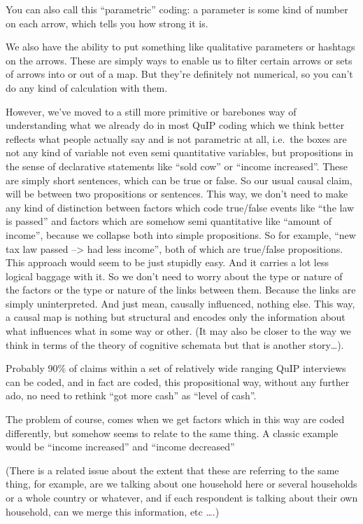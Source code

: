 \documentclass[
]{book}
\begin{document}
You can also call this ``parametric'' coding: a parameter is some kind of number on each arrow, which tells you how strong it is.

We also have the ability to put something like qualitative parameters or hashtags on the arrows. These are simply ways to enable us to filter certain arrows or sets of arrows into or out of a map. But they're definitely not numerical, so you can't do any kind of calculation with them.

However, we've moved to a still more primitive or barebones way of understanding what we already do in most QuIP coding
which we think better reflects what people actually say and is not parametric at all, i.e.~the boxes are not any kind of variable not even semi quantitative variables, but propositions in the sense of declarative statements like ``sold cow'' or ``income increased''. These are simply short sentences, which can be true or false. So our usual causal claim, will be between
two propositions or sentences. This way, we don't need to make any kind of distinction between factors which
code true/false events like ``the law is passed'' and factors which are somehow semi quantitative like ``amount of income'', because we collapse both into simple propositions. So for example, ``new tax law passed --\textgreater{} had less income'', both of which are true/false propositions. This approach would seem to be just stupidly easy. And it carries a lot less logical baggage with it. So we don't need to worry about the type or nature of the factors or the type or nature of the links between them. Because the links are simply uninterpreted. And just mean, causally influenced, nothing else. This way, a causal map is nothing but structural and encodes only the information about what influences what in some way or other. (It may also be closer to the way we think in terms of the theory of cognitive schemata but that is another story\ldots).

Probably 90\% of claims within a set of relatively wide ranging QuIP interviews can be coded, and in fact are coded, this propositional way, without any further ado, no need to rethink ``got more cash'' as ``level of cash''.

The problem of course, comes when we get factors which in this way are coded differently, but somehow seems to relate to the same thing. A classic example would be ``income increased'' and ``income decreased''

(There is a related issue about the extent that these are referring to the same thing, for example, are we talking about one household here or several households or a whole country or whatever, and if each respondent is talking about their own household, can we merge this information, etc \ldots.)
\end{document}
